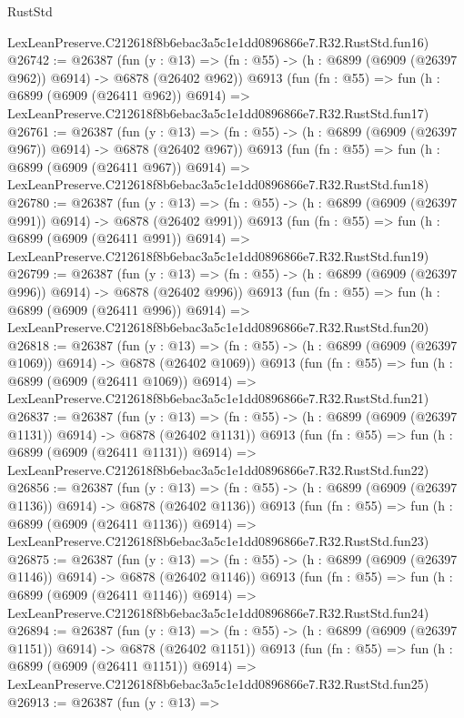 \begin{lexlean}{RustStd}
\begin{coremodule}
    LexLeanPreserve.C212618f8b6ebac3a5c1e1dd0896866e7.R32.RustStd.fun16)
@26742 := @26387
    (fun (y : @13) => (fn : @55) -> (h : @6899 (@6909 (@26397 @962)) @6914) -> @6878 (@26402 @962))
    @6913
    (fun (fn : @55) =>
    fun (h : @6899 (@6909 (@26411 @962)) @6914) =>
    LexLeanPreserve.C212618f8b6ebac3a5c1e1dd0896866e7.R32.RustStd.fun17)
@26761 := @26387
    (fun (y : @13) => (fn : @55) -> (h : @6899 (@6909 (@26397 @967)) @6914) -> @6878 (@26402 @967))
    @6913
    (fun (fn : @55) =>
    fun (h : @6899 (@6909 (@26411 @967)) @6914) =>
    LexLeanPreserve.C212618f8b6ebac3a5c1e1dd0896866e7.R32.RustStd.fun18)
@26780 := @26387
    (fun (y : @13) => (fn : @55) -> (h : @6899 (@6909 (@26397 @991)) @6914) -> @6878 (@26402 @991))
    @6913
    (fun (fn : @55) =>
    fun (h : @6899 (@6909 (@26411 @991)) @6914) =>
    LexLeanPreserve.C212618f8b6ebac3a5c1e1dd0896866e7.R32.RustStd.fun19)
@26799 := @26387
    (fun (y : @13) => (fn : @55) -> (h : @6899 (@6909 (@26397 @996)) @6914) -> @6878 (@26402 @996))
    @6913
    (fun (fn : @55) =>
    fun (h : @6899 (@6909 (@26411 @996)) @6914) =>
    LexLeanPreserve.C212618f8b6ebac3a5c1e1dd0896866e7.R32.RustStd.fun20)
@26818 := @26387
    (fun (y : @13) =>
    (fn : @55) -> (h : @6899 (@6909 (@26397 @1069)) @6914) -> @6878 (@26402 @1069))
    @6913
    (fun (fn : @55) =>
    fun (h : @6899 (@6909 (@26411 @1069)) @6914) =>
    LexLeanPreserve.C212618f8b6ebac3a5c1e1dd0896866e7.R32.RustStd.fun21)
@26837 := @26387
    (fun (y : @13) =>
    (fn : @55) -> (h : @6899 (@6909 (@26397 @1131)) @6914) -> @6878 (@26402 @1131))
    @6913
    (fun (fn : @55) =>
    fun (h : @6899 (@6909 (@26411 @1131)) @6914) =>
    LexLeanPreserve.C212618f8b6ebac3a5c1e1dd0896866e7.R32.RustStd.fun22)
@26856 := @26387
    (fun (y : @13) =>
    (fn : @55) -> (h : @6899 (@6909 (@26397 @1136)) @6914) -> @6878 (@26402 @1136))
    @6913
    (fun (fn : @55) =>
    fun (h : @6899 (@6909 (@26411 @1136)) @6914) =>
    LexLeanPreserve.C212618f8b6ebac3a5c1e1dd0896866e7.R32.RustStd.fun23)
@26875 := @26387
    (fun (y : @13) =>
    (fn : @55) -> (h : @6899 (@6909 (@26397 @1146)) @6914) -> @6878 (@26402 @1146))
    @6913
    (fun (fn : @55) =>
    fun (h : @6899 (@6909 (@26411 @1146)) @6914) =>
    LexLeanPreserve.C212618f8b6ebac3a5c1e1dd0896866e7.R32.RustStd.fun24)
@26894 := @26387
    (fun (y : @13) =>
    (fn : @55) -> (h : @6899 (@6909 (@26397 @1151)) @6914) -> @6878 (@26402 @1151))
    @6913
    (fun (fn : @55) =>
    fun (h : @6899 (@6909 (@26411 @1151)) @6914) =>
    LexLeanPreserve.C212618f8b6ebac3a5c1e1dd0896866e7.R32.RustStd.fun25)
@26913 := @26387
    (fun (y : @13) =>

\end{coremodule}
\end{lexlean}
